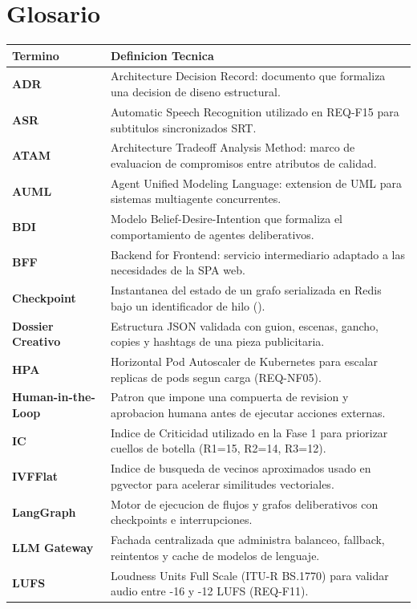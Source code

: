 \documentclass[11pt,a4paper]{article}
\newcommand{\code}[1]{\texttt{\detokenize{#1}}}
\begin{document}
\section{Glosario}\label{section-glossary}
\begin{longtable}{p{3.8cm}p{11.2cm}}
\toprule
Termino & Definicion Tecnica \\
\midrule
\endhead
\bottomrule
\endfoot
\textbf{ADR} & Architecture Decision Record: documento que formaliza una decision de diseno estructural. \\
\textbf{ASR} & Automatic Speech Recognition utilizado en REQ-F15 para subtitulos sincronizados SRT. \\
\textbf{ATAM} & Architecture Tradeoff Analysis Method: marco de evaluacion de compromisos entre atributos de calidad. \\
\textbf{AUML} & Agent Unified Modeling Language: extension de UML para sistemas multiagente concurrentes. \\
\textbf{BDI} & Modelo Belief-Desire-Intention que formaliza el comportamiento de agentes deliberativos. \\
\textbf{BFF} & Backend for Frontend: servicio intermediario adaptado a las necesidades de la SPA web. \\
\textbf{Checkpoint} & Instantanea del estado de un grafo serializada en Redis bajo un identificador de hilo (\code{thread_id}). \\
\textbf{Dossier Creativo} & Estructura JSON validada con guion, escenas, gancho, copies y hashtags de una pieza publicitaria. \\
\textbf{HPA} & Horizontal Pod Autoscaler de Kubernetes para escalar replicas de pods segun carga (REQ-NF05). \\
\textbf{Human-in-the-Loop} & Patron que impone una compuerta de revision y aprobacion humana antes de ejecutar acciones externas. \\
\textbf{IC} & Indice de Criticidad utilizado en la Fase 1 para priorizar cuellos de botella (R1=15, R2=14, R3=12). \\
\textbf{IVFFlat} & Indice de busqueda de vecinos aproximados usado en pgvector para acelerar similitudes vectoriales. \\
\textbf{LangGraph} & Motor de ejecucion de flujos y grafos deliberativos con checkpoints e interrupciones. \\
\textbf{LLM Gateway} & Fachada centralizada que administra balanceo, fallback, reintentos y cache de modelos de lenguaje. \\
\textbf{LUFS} & Loudness Units Full Scale (ITU-R BS.1770) para validar audio entre -16 y -12 LUFS (REQ-F11). \\

\end{longtable}
\end{document}
